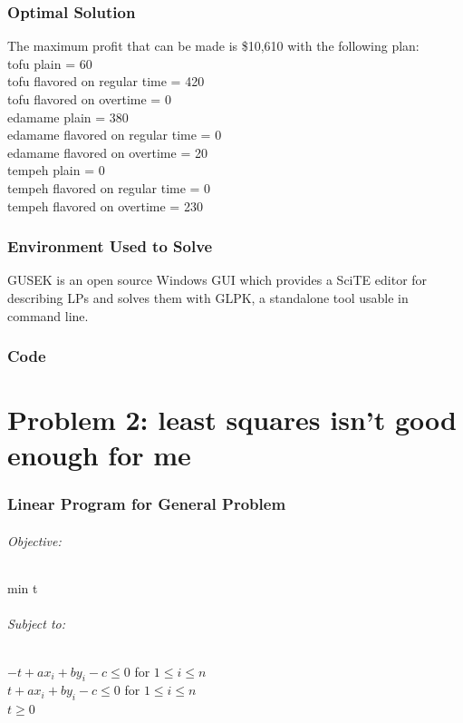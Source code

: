 \documentclass{article}
\begin{document}
\section*{Optimal Solution}
The maximum profit that can be made is \$10,610 with the following plan:\\
tofu plain = 60\\
tofu flavored on regular time = 420\\
tofu flavored on overtime = 0\\
edamame plain = 380\\
edamame flavored on regular time = 0\\
edamame flavored on overtime = 20\\
tempeh plain = 0\\
tempeh flavored on regular time = 0\\
tempeh flavored on overtime = 230\\

\section*{Environment Used to Solve}
GUSEK is an open source Windows GUI which provides a SciTE editor for describing LPs and solves them with GLPK, a standalone tool usable in command line.

\section*{Code}


\pagebreak


\part*{Problem 2: least squares isn't good enough for me}
\section*{Linear Program for General Problem}
\paragraph*{Objective:}
min t

\paragraph*{Subject to:\\}
$-t + ax_i + by_i - c \leq 0$ for $1 \leq i \leq n$\\
$t + ax_i + by_i - c \leq 0$ for $1 \leq i \leq n$\\
$t \geq 0$\\
\end{document}
